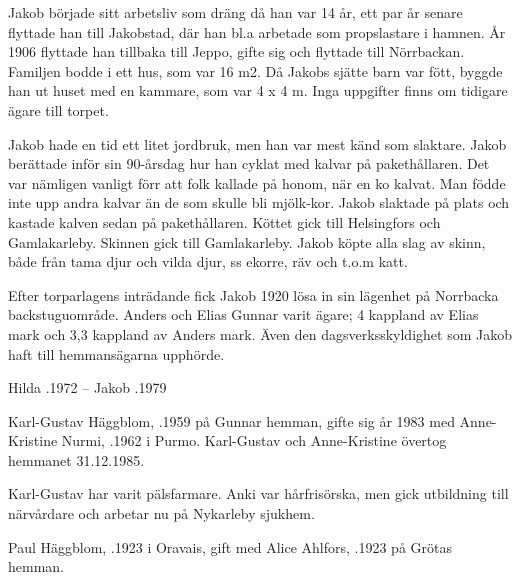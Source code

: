 Jakob började sitt arbetsliv som dräng då han var 14 år, ett par år senare flyttade han till Jakobstad, där han bl.a arbetade som propslastare i hamnen. År 1906 flyttade han tillbaka till Jeppo, gifte sig och flyttade till Nörrbackan. Familjen bodde i ett hus, som var 16 m2. Då Jakobs sjätte barn var fött, byggde han ut huset med en kammare, som var 4 x 4 m. Inga uppgifter finns om tidigare ägare till torpet.

Jakob hade en tid ett litet jordbruk, men han var mest känd som slaktare. Jakob berättade inför sin 90-årsdag hur han cyklat med kalvar på pakethållaren. Det var nämligen vanligt förr att folk kallade på honom, när en ko kalvat. Man födde inte upp andra kalvar än de som skulle bli mjölk-kor. Jakob slaktade på plats och kastade kalven sedan på pakethållaren. Köttet gick till Helsingfors och Gamlakarleby. Skinnen gick till Gamlakarleby. Jakob köpte alla slag av skinn, både 			från tama djur och vilda djur, ss ekorre, räv och t.o.m katt.

Efter torparlagens inträdande fick Jakob 1920 lösa in sin lägenhet på Norrbacka backstuguområde. Anders och Elias Gunnar varit ägare; 4 kappland av Elias mark och 3,3 kappland av Anders mark. Även den dagsverksskyldighet som Jakob haft till hemmansägarna upphörde.

Hilda .1972  --  Jakob .1979






Karl-Gustav Häggblom, .1959 på Gunnar hemman, gifte sig år 1983 med Anne-Kristine Nurmi, .1962 i Purmo. Karl-Gustav och Anne-Kristine övertog hemmanet 31.12.1985.

Karl-Gustav har varit pälsfarmare. Anki var hårfrisörska, men gick utbildning till närvårdare och arbetar nu på Nykarleby sjukhem.

\begin{jhchildren}
  \item {}
  \item {}
\end{jhchildren}


Paul Häggblom, .1923 i Oravais, gift med Alice Ahlfors, .1923 på Grötas hemman.

